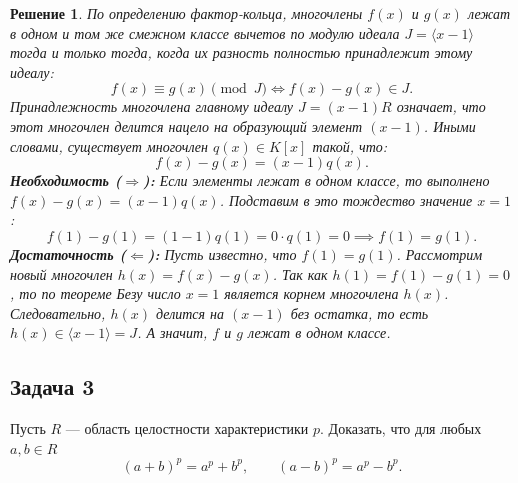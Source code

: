 \documentclass[14pt]{article}
\newtheorem*{solution}{Решение}
\begin{document}
	\begin{solution}
		По определению фактор-кольца, многочлены $f(x)$ и $g(x)$ лежат в одном и том же смежном классе вычетов по модулю идеала $J = \langle x-1 \rangle$ тогда и только тогда, когда их разность полностью принадлежит этому идеалу:
		\[
		f(x) \equiv g(x) \pmod J \iff f(x) - g(x) \in J.
		\]
		Принадлежность многочлена главному идеалу $J = (x-1)R$ означает, что этот многочлен делится нацело на образующий элемент $(x-1)$. Иными словами, существует многочлен $q(x) \in K[x]$ такой, что:
		\[
		f(x) - g(x) = (x-1)q(x).
		\]
		\textbf{Необходимость ($\Rightarrow$):} Если элементы лежат в одном классе, то выполнено $f(x) - g(x) = (x-1)q(x)$. Подставим в это тождество значение $x = 1$:
		\[
		f(1) - g(1) = (1-1)q(1) = 0 \cdot q(1) = 0 \implies f(1) = g(1).
		\]
		\textbf{Достаточность ($\Leftarrow$):} Пусть известно, что $f(1) = g(1)$. Рассмотрим новый многочлен $h(x) = f(x) - g(x)$. Так как $h(1) = f(1) - g(1) = 0$, то по теореме Безу число $x=1$ является корнем многочлена $h(x)$. Следовательно, $h(x)$ делится на $(x-1)$ без остатка, то есть $h(x) \in \langle x-1 \rangle = J$. А значит, $f$ и $g$ лежат в одном классе.
	\end{solution}
	
	\subsection*{Задача 3}
	Пусть $R$ — область целостности характеристики $p$. Доказать, что для любых $a,b\in R$
	\[
	(a+b)^p=a^p+b^p,\qquad (a-b)^p=a^p-b^p.
	\]
	
\end{document}
